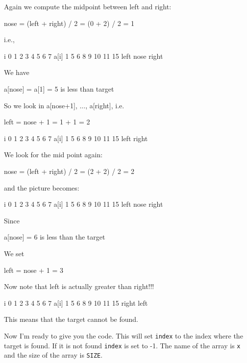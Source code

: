 Again we compute the midpoint between left and right:
\begin{center}
nose = (left + right) / 2 = (0 + 2) / 2 = 1
\end{center}
i.e.,

\begin{consolethree}[escapeinside=||]
i      0    1    2    3    4    5    6    7
a[i]   1    5    6    8    9    10   11   15
    left  nose  right
\end{consolethree}

We have
\begin{center}
a[nose] = a[1] = 5 is less than target
\end{center}
So we look in a[nose+1], ..., a[right], i.e.
\begin{center}
left = nose + 1 = 1 + 1 = 2
\end{center}
\begin{consolethree}[escapeinside=||]
i      0    1    2    3    4    5    6    7
a[i]   1    5    6    8    9    10   11   15
               left
               right
\end{consolethree}

We look for the mid point again:
\begin{center}
nose = (left + right) / 2 = (2 + 2) / 2 = 2
\end{center}
and the picture becomes:

\begin{consolethree}[escapeinside=||]
i      0    1    2    3    4    5    6    7
a[i]   1    5    6    8    9    10   11   15
                left
                nose
                right
\end{consolethree}

Since
\begin{center}
a[nose] = 6 is less than the target
\end{center}

We set
\begin{center}
left = nose + 1 = 3
\end{center}
Now note that left is actually greater than right!!!

\begin{consolethree}[escapeinside=||]
i      0    1    2    3    4    5    6    7
a[i]   1    5    6    8    9    10   11   15
               right left
\end{consolethree}

This means that the target cannot be found.

Now I'm ready to give you the code. This will set \texttt{index} to the index where the target is found. If it is not found \texttt{index} is set to -1. The name of the array is \texttt{x} and the size of the array is \texttt{SIZE}.

